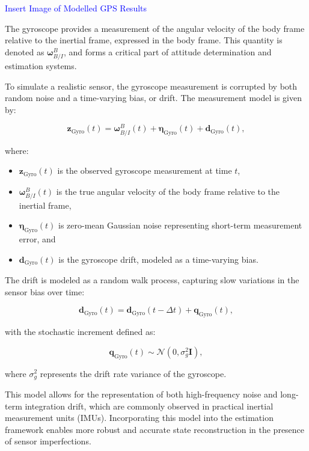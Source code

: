 \textcolor{blue}{Insert Image of Modelled GPS Results}


The gyroscope provides a measurement of the angular velocity of the body frame relative to the inertial frame, expressed in the body frame. This quantity is denoted as $\boldsymbol{\omega}^B_{B/I}$, and forms a critical part of attitude determination and estimation systems.

To simulate a realistic sensor, the gyroscope measurement is corrupted by both random noise and a time-varying bias, or drift. The measurement model is given by:

\begin{equation}
    \mathbf{z}_{\text{Gyro}}(t) = \boldsymbol{\omega}^B_{B/I}(t) + \boldsymbol{\eta}_{\text{Gyro}}(t) + \mathbf{d}_{\text{Gyro}}(t),
\end{equation}

where:
\begin{itemize}
    \item $\mathbf{z}_{\text{Gyro}}(t)$ is the observed gyroscope measurement at time $t$,
    \item $\boldsymbol{\omega}^B_{B/I}(t)$ is the true angular velocity of the body frame relative to the inertial frame,
    \item $\boldsymbol{\eta}_{\text{Gyro}}(t)$ is zero-mean Gaussian noise representing short-term measurement error, and
    \item $\mathbf{d}_{\text{Gyro}}(t)$ is the gyroscope drift, modeled as a time-varying bias.
\end{itemize}

The drift is modeled as a random walk process, capturing slow variations in the sensor bias over time:

\begin{equation}
    \mathbf{d}_{\text{Gyro}}(t) = \mathbf{d}_{\text{Gyro}}(t - \Delta t) + \mathbf{q}_{\text{Gyro}}(t),
\end{equation}

with the stochastic increment defined as:

\begin{equation}
    \mathbf{q}_{\text{Gyro}}(t) \sim \mathcal{N}(0, \sigma_g^2 \mathbf{I}),
\end{equation}

where $\sigma_g^2$ represents the drift rate variance of the gyroscope.

This model allows for the representation of both high-frequency noise and long-term integration drift, which are commonly observed in practical inertial measurement units (IMUs). Incorporating this model into the estimation framework enables more robust and accurate state reconstruction in the presence of sensor imperfections.





